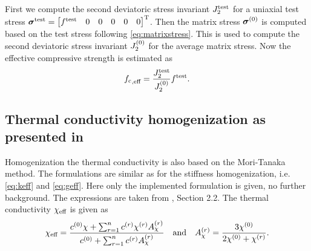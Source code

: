 First we compute the second deviatoric stress invariant $J_2^{\text{test}}$ for a uniaxial test stress $\boldsymbol{\sigma}^{\text{test}} = \begin{bmatrix} f^{\text{test}} & 0 & 0 &0&0&0 \end{bmatrix}^\text{T}$. Then the matrix stress $\boldsymbol{\sigma}^{(0)}$ is computed based on the test stress following \eqref{eq:matrixstress}. This is used to compute the second deviatoric stress invariant $J_2^{(0)}$ for the average matrix stress.
Now the effective compressive strength is estimated as
\begin{align}
	{f_{\text{c}}}_{,\text{eff}} = \frac{J_2^{\text{test}}}{J_2^{(0)}} f^{\text{test}}.
\end{align}


\subsection{Thermal conductivity homogenization as presented in \cite{str_2011_mbeo}}
Homogenization the thermal conductivity is also based on the Mori-Tanaka method.
The formulations are similar as for the stiffness homogenization, i.e. \eqref{eq:keff} and \eqref{eq:geff}.
Here only the implemented formulation is given, no further background.
The expressions are taken from \cite{str_2011_mbeo}, Section 2.2.
The thermal conductivity $\chi_{\text{eff}}$ is given as
\begin{align}
	\chi_{\text{eff}} = \dfrac{c^{(0)}\chi + \sum^{n}_{r=1} c^{(r)} \chi^{(r)} A_{\chi}^{(r)}}{c^{(0)} + \sum^{n}_{r=1} c^{(r)} A_{\chi}^{(r)}}\quad\text{and}\quad
	A_{\chi}^{(r)} = \frac{3\chi^{(0)}}{2\chi^{(0)}+\chi^{(r)}}.
\end{align}

